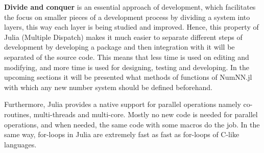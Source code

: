 \textbf{Divide and conquer} is an essential approach of development, which facilitates the focus on smaller pieces of a development process by dividing a system into layers, this way each layer is being studied and improved. Hence, this property of Julia (Multiple Dispatch) makes it much easier to separate different steps of development by developing a package and then integration with it will be separated of the source code. This means that less time is used on editing and modifying, and more time is used for designing, testing and developing. In the upcoming sections it will be presented what methods of functions of NumNN.jl with which any new number system should be defined beforehand.

Furthermore, Julia provides a native support for parallel operations namely co-routines, multi-threads and multi-core. Mostly no new code is needed for parallel operations, and when needed, the same code with some macros do the job. In the same way, for-loops in Julia are extremely fast as fast as for-loops of C-like languages. 

